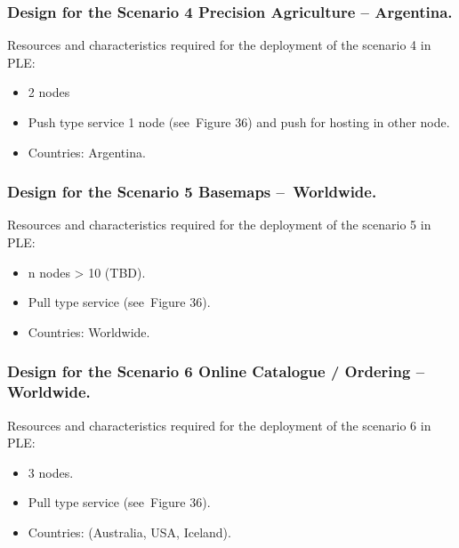 \documentclass[a4paper]{article}
\newcommand\liststyleLFOxl{%
\renewcommand\labelitemi{[F0B7?]}
\renewcommand\labelitemii{o}
\renewcommand\labelitemiii{[F0A7?]}
\renewcommand\labelitemiv{[F0B7?]}
}
\begin{document}
\subsubsection[Design for the Scenario 4 Precision Agriculture {}--
Argentina.]{Design for the Scenario 4 Precision Agriculture --
Argentina.}
\hypertarget{Toc381777249}{}
\bigskip

Resources and characteristics required for the deployment of the
scenario 4 in PLE:\ 

\liststyleLFOxl
\begin{itemize}
\item 2 nodes
\item Push type service 1 node (see\ Figure 36) and push for hosting in
other node.
\item Countries: Argentina.
\end{itemize}
\subsubsection[Design for the Scenario 5 Basemaps
{}--\ Worldwide.]{Design for the Scenario 5 Basemaps --\ Worldwide.}
\hypertarget{Toc381777250}{}
\bigskip

Resources and characteristics required for the deployment of the
scenario 5 in PLE:\ 

\liststyleLFOxl
\begin{itemize}
\item n nodes {\textgreater} 10 (TBD).
\item Pull type service (see\ Figure 36).
\item Countries: Worldwide.
\end{itemize}
\subsubsection[Design for the Scenario 6 Online Catalogue / Ordering
{}-- Worldwide.]{Design for the Scenario 6 Online Catalogue / Ordering
-- Worldwide.}
\hypertarget{Toc381777251}{}
\bigskip

Resources and characteristics required for the deployment of the
scenario 6 in PLE:\ 

\liststyleLFOxl
\begin{itemize}
\item 3 nodes.
\item Pull type service (see\ Figure 36).
\item Countries: (Australia, USA, Iceland).
\end{itemize}
\end{document}
